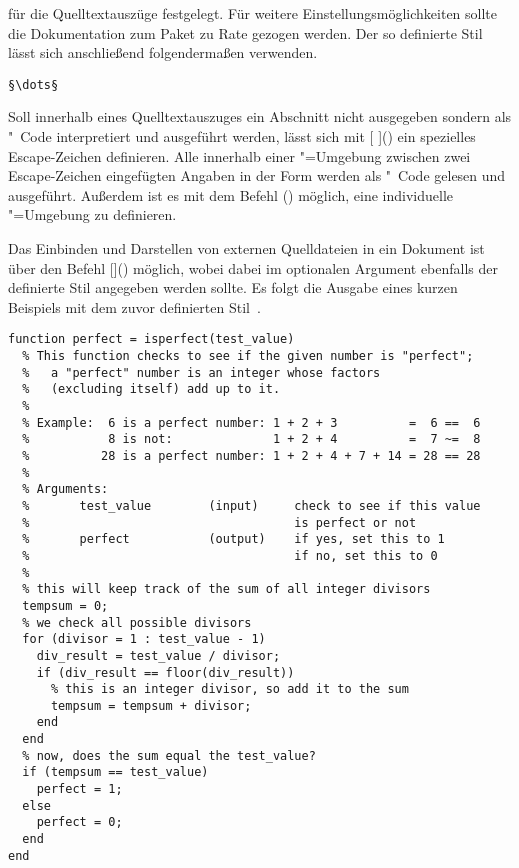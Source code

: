 \documentclass[%
  english,ngerman,%
  cdgeometry=no,DIV=12,automark%
]{tudscrartcl}
\begin{document}
für die Quelltextauszüge festgelegt. Für weitere Einstellungsmöglichkeiten 
sollte die Dokumentation zum Paket zu Rate gezogen werden. Der so definierte 
Stil lässt sich anschließend folgendermaßen verwenden.
%
\begin{Hint}
\begin{lstlisting}[style=matlab]
§\dots§
\end{lstlisting}
\end{Hint}
%
Soll innerhalb eines Quelltextauszuges ein Abschnitt nicht ausgegeben sondern 
als "~Code interpretiert und ausgeführt werden, lässt sich mit 
[%
]() ein spezielles Escape-Zeichen definieren. Alle innerhalb 
einer "=Umgebung zwischen zwei Escape-Zeichen eingefügten 
Angaben in der Form \PValue{\dots} werden als 
"~Code gelesen und ausgeführt. Außerdem ist es mit dem Befehl 
() möglich, eine individuelle 
"=Umgebung zu definieren.

Das Einbinden und Darstellen von externen Quelldateien in ein Dokument ist über 
den Befehl
[\LParameter{}]() 
möglich, wobei dabei im optionalen Argument ebenfalls der definierte Stil 
angegeben werden sollte. Es folgt die Ausgabe eines kurzen Beispiels mit dem 
zuvor definierten Stil~.
%
\begin{lstlisting}[style=matlab]
function perfect = isperfect(test_value)
  % This function checks to see if the given number is "perfect";
  %   a "perfect" number is an integer whose factors 
  %   (excluding itself) add up to it.
  %
  % Example:  6 is a perfect number: 1 + 2 + 3          =  6 ==  6
  %           8 is not:              1 + 2 + 4          =  7 ~=  8
  %          28 is a perfect number: 1 + 2 + 4 + 7 + 14 = 28 == 28
  %
  % Arguments:
  %       test_value        (input)     check to see if this value 
  %                                     is perfect or not
  %       perfect           (output)    if yes, set this to 1
  %                                     if no, set this to 0
  %
  % this will keep track of the sum of all integer divisors
  tempsum = 0;
  % we check all possible divisors
  for (divisor = 1 : test_value - 1)
    div_result = test_value / divisor;
    if (div_result == floor(div_result)) 
      % this is an integer divisor, so add it to the sum
      tempsum = tempsum + divisor;
    end
  end
  % now, does the sum equal the test_value?
  if (tempsum == test_value) 
    perfect = 1;
  else
    perfect = 0;
  end
end
\end{lstlisting}
\end{document}
